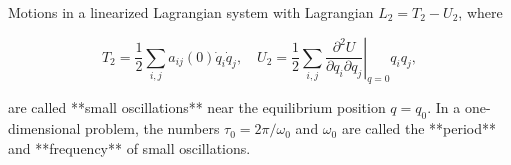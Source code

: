 Motions in a linearized Lagrangian system with Lagrangian $L_2 = T_2 - U_2$, where

$$T_2 = \frac{1}{2} \sum_{i,j} a_{ij}(0) \dot{q}_i \dot{q}_j, \quad U_2 = \frac{1}{2} \sum_{i,j} \left. \frac{\partial^2 U}{\partial q_i \partial q_j} \right|_{q=0} q_i q_j,$$

are called **small oscillations** near the equilibrium position $q = q_0$. In a one-dimensional problem, the numbers $\tau_0 = 2\pi/\omega_0$ and $\omega_0$ are called the **period** and **frequency** of small oscillations.
